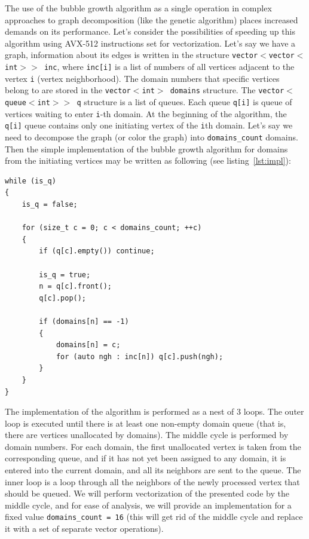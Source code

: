 \documentclass[
11pt,%
tightenlines,%
twoside,%
onecolumn,%
nofloats,%
nobibnotes,%
nofootinbib,%
superscriptaddress,%
noshowpacs,%
centertags]%
{revtex4}
\begin{document}
The use of the bubble growth algorithm as a single operation in complex approaches to graph decomposition (like the genetic algorithm) places increased demands on its performance.
Let's consider the possibilities of speeding up this algorithm using AVX-512 instructions set for vectorization.
Let's say we have a graph, information about its edges is written in the structure \texttt{vector$<$vector$<$int$>>$ inc}, where \texttt{inc[i]} is a list of numbers of all vertices adjacent to the vertex \texttt{i} (vertex neighborhood).
The domain numbers that specific vertices belong to are stored in the \texttt{vector$<$int$>$ domains} structure.
The \texttt{vector$<$queue$<$int$>>$ q} structure is a list of queues.
Each queue \texttt{q[i]} is queue of vertices waiting to enter \texttt{i}-th domain.
At the beginning of the algorithm, the \texttt{q[i]} queue contains only one initiating vertex of the \texttt{i}th domain.
Let's say we need to decompose the graph (or color the graph) into \texttt{domains\_count} domains.
Then the simple implementation of the bubble growth algorithm for domains from the initiating vertices may be written as following (see listing~\ref{lst:impl}):

\begin{lstlisting}[caption={Implementation of the bubble domain growth algorithm.},label={lst:impl}]
while (is_q)
{
    is_q = false;

    for (size_t c = 0; c < domains_count; ++c)
    {
        if (q[c].empty()) continue;

        is_q = true;
        n = q[c].front();
        q[c].pop();

        if (domains[n] == -1)
        {
            domains[n] = c;
            for (auto ngh : inc[n]) q[c].push(ngh);
        }
    }
}
\end{lstlisting}

The implementation of the algorithm is performed as a nest of 3 loops.
The outer loop is executed until there is at least one non-empty domain queue (that is, there are vertices unallocated by domains).
The middle cycle is performed by domain numbers.
For each domain, the first unallocated vertex is taken from the corresponding queue, and if it has not yet been assigned to any domain, it is entered into the current domain, and all its neighbors are sent to the queue.
The inner loop is a loop through all the neighbors of the newly processed vertex that should be queued.
We will perform vectorization of the presented code by the middle cycle, and for ease of analysis, we will provide an implementation for a fixed value \texttt{domains\_count = 16} (this will get rid of the middle cycle and replace it with a set of separate vector operations).
\end{document}
